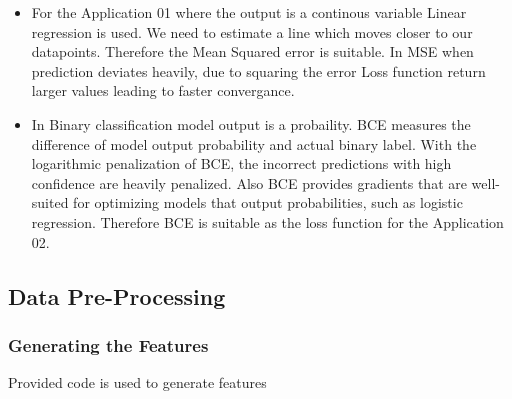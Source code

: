 \documentclass[11pt]{article}
\begin{document}
\begin{itemize}
\item
  For the Application 01 where the output is a continous variable Linear
  regression is used. We need to estimate a line which moves closer to
  our datapoints. Therefore the Mean Squared error is suitable. In MSE
  when prediction deviates heavily, due to squaring the error Loss
  function return larger values leading to faster convergance.
\item
  In Binary classification model output is a probaility. BCE measures
  the difference of model output probability and actual binary label.
  With the logarithmic penalization of BCE, the incorrect predictions
  with high confidence are heavily penalized. Also BCE provides
  gradients that are well-suited for optimizing models that output
  probabilities, such as logistic regression. Therefore BCE is suitable
  as the loss function for the Application 02.
\end{itemize}

    \subsection{Data Pre-Processing}\label{data-pre-processing}

    \subsubsection{Generating the Features}\label{generating-the-features}

Provided code is used to generate features
\end{document}
